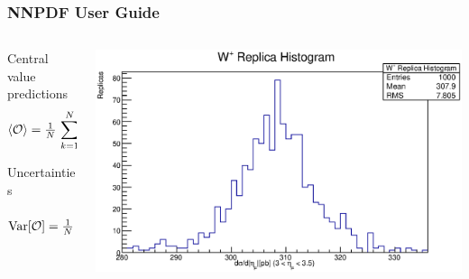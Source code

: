 \documentclass[10pt]{beamer}
\newcommand{\be}{\begin{equation*}}
\newcommand{\ee}{\end{equation*}}
\newcommand{\vso}{\vskip15pt}
\def\smallfrac#1#2{\hbox{${{#1}\over {#2}}$}}
\begin{document}
\begin{frame}
\frametitle{NNPDF User Guide}

\begin{columns}
\begin{column}{0.4\textwidth}
\small
\begin{block} 
{ \small Central value predictions}
		\small \be \langle\mathcal{O}\rangle=\smallfrac{1}{N}\,\sum_{k=1}^{N}\mathcal{O}[f_k]\, .\ee
\end{block}
\vskip5pt
\begin{block}
{\small Uncertainties }
	\small	\be {\mathrm{Var}}[\mathcal{O}]=\smallfrac{1}{N}\,\sum_{k=1}^{N}(\mathcal{O}[f_k] -  \langle\mathcal{O}\rangle )^2 .\ee
\end{block}
\end{column}

\begin{column}{0.6\textwidth}
      \includegraphics[width=\textwidth]{WpHist.eps}
\end{column}
\end{columns}

\vso
{}

\end{frame}

%
%		
%	
%	
\end{document}
